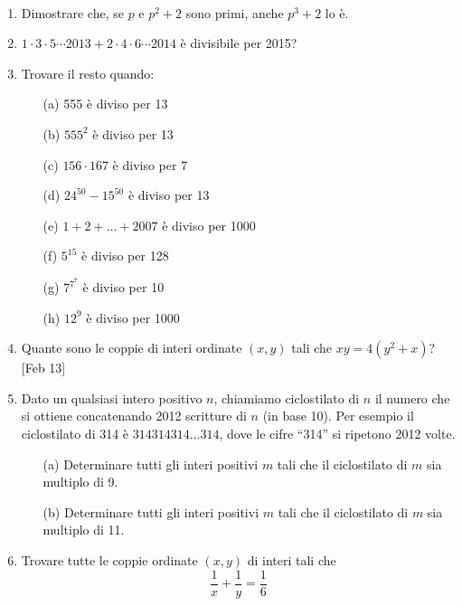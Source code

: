 \documentclass[a4paper]{article}
\newcommand{\Intitola}{\begin{center}
		\vspace*{0,5 cm}
		{\Huge \textsc{\Title}} \\
		\vspace{0,5 cm}
		\textsc{\Author} \hspace{1cm} \textsc{\Date}
		\thispagestyle{empty}
		\vspace{0,7 cm}
\end{center}}
\theoremstyle{remark}
\theoremstyle{definition}
\begin{document}
\Intitola
\normalsize



\begin{enumerate}
	\item Dimostrare che, se $ p $ e $ p^2 +2 $ sono primi, anche $ p^3 +2 $ lo è.
	
	\item $  1 \cdot 3 \cdot 5 \cdots 2013 + 2 \cdot 4 \cdot 6 \cdots 2014  $ è divisibile per 2015?
	
	\item Trovare il resto quando:
	\begin{itemize}
		\item [(a)] 555 è diviso per 13 \\
		\item [(b)] $ 555^2$ è diviso per 13\\
		\item [(c)] $ 156 \cdot 167 $ è diviso per 7 \\
		\item [(d)] $ 24^{50} - 15^{50} $ è diviso per 13\\
		\item [(e)] $ 1 + 2 + \dots + 2007 $ è diviso per 1000\\
		\item [(f)] $ 5^{15} $ è diviso per 128\\
		\item [(g)]$  7^{7^7} $ è diviso per 10\\
		\item [(h)] $ 12^9 $ è diviso per 1000\\
	\end{itemize}
	
	
	\item Quante sono le coppie di interi ordinate $ (x, y) $ tali che $ xy = 4(y^2 + x) $? [Feb 13] \\
	
	\item Dato un qualsiasi intero positivo $ n $, chiamiamo ciclostilato di $ n $ il numero che si ottiene concatenando 2012 scritture di $ n $ (in base 10). Per esempio il ciclostilato di 314 è $ 314314314\dots314 $, dove le cifre “314” si ripetono 2012 volte.
	\begin{itemize}
		\item [(a)] Determinare tutti gli interi positivi $ m $ tali che il ciclostilato di $ m $ sia multiplo di 9.
		\item [(b)] Determinare tutti gli interi positivi $ m $ tali che il ciclostilato di $ m $ sia multiplo di 11.
	\end{itemize}
	
	
	\item Trovare tutte le coppie ordinate $ (x, y) $ di interi tali che $$  \dfrac{1}{x} + \dfrac{1}{y} = \dfrac{1}{6}  $$
	
\end{enumerate}
\end{document}
